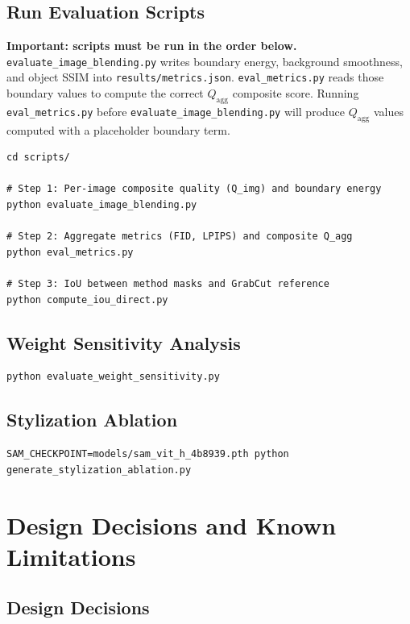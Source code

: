 \documentclass[11pt,a4paper]{article}
\begin{document}
\subsection{Run Evaluation Scripts}

\textbf{Important: scripts must be run in the order below.} \texttt{evaluate\_image\_blending.py} writes boundary energy, background smoothness, and object SSIM into \texttt{results/metrics.json}. \texttt{eval\_metrics.py} reads those boundary values to compute the correct $Q_{\text{agg}}$ composite score. Running \texttt{eval\_metrics.py} before \texttt{evaluate\_image\_blending.py} will produce $Q_{\text{agg}}$ values computed with a placeholder boundary term.

\begin{lstlisting}[style=bash]
cd scripts/

# Step 1: Per-image composite quality (Q_img) and boundary energy
python evaluate_image_blending.py

# Step 2: Aggregate metrics (FID, LPIPS) and composite Q_agg
python eval_metrics.py

# Step 3: IoU between method masks and GrabCut reference
python compute_iou_direct.py
\end{lstlisting}

\subsection{Weight Sensitivity Analysis}

\begin{lstlisting}[style=bash]
python evaluate_weight_sensitivity.py
\end{lstlisting}

\subsection{Stylization Ablation}

\begin{lstlisting}[style=bash]
SAM_CHECKPOINT=models/sam_vit_h_4b8939.pth python generate_stylization_ablation.py
\end{lstlisting}

\section{Design Decisions and Known Limitations}

\subsection{Design Decisions}
\end{document}
